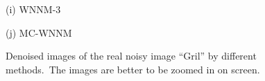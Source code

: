 \documentclass[10pt,onecolumn,letterpaper]{article}
\begin{document}
\begin{figure}
{\begin{minipage}[t]{0.2\textwidth}
{\footnotesize (i) WNNM-3 \cite{wnnm}   }
\end{minipage}
\begin{minipage}[t]{0.2\textwidth}
\centering
{}
{\footnotesize (j) MC-WNNM  }
\end{minipage}
}
\vspace{-2mm}
\caption{Denoised images of the real noisy image ``Gril'' \cite{ncwebsite} by different methods.\ The images are better to be zoomed in on screen.}
\label{f3}
\vspace{-2mm}
\end{figure}
\end{document}

